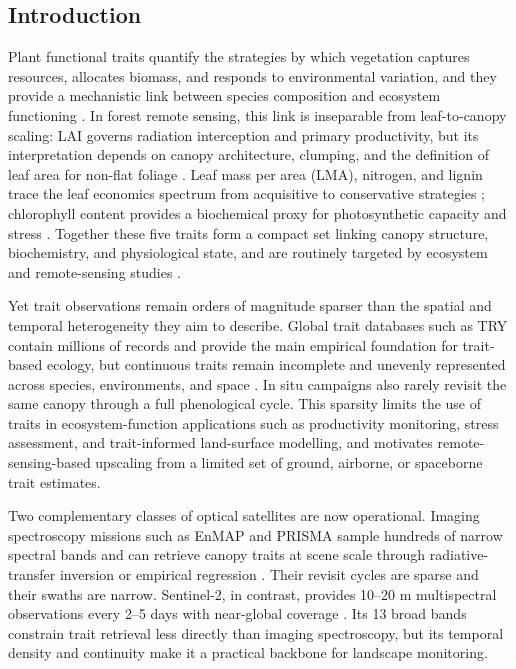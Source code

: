 \documentclass[final,times,onecolumn, authoryear]{elsarticle}
\begin{document}
\begin{linenumbers}

\section{Introduction}

Plant functional traits quantify the strategies by which vegetation captures resources, allocates biomass, and responds to environmental variation, and they provide a mechanistic link between species composition and ecosystem functioning \citep{wright2004leaf, diaz2016global}. In forest remote sensing, this link is inseparable from leaf-to-canopy scaling: LAI governs radiation interception and primary productivity, but its interpretation depends on canopy architecture, clumping, and the definition of leaf area for non-flat foliage \citep{chen1992lai, chen1995gap, chen1996optical}. Leaf mass per area (LMA), nitrogen, and lignin trace the leaf economics spectrum from acquisitive to conservative strategies \citep{wright2004leaf}; chlorophyll content provides a biochemical proxy for photosynthetic capacity and stress \citep{croft2017chlorophyll}. Together these five traits form a compact set linking canopy structure, biochemistry, and physiological state, and are routinely targeted by ecosystem and remote-sensing studies \citep{jetz2016monitoring}.

Yet trait observations remain orders of magnitude sparser than the spatial and temporal heterogeneity they aim to describe. Global trait databases such as TRY contain millions of records and provide the main empirical foundation for trait-based ecology, but continuous traits remain incomplete and unevenly represented across species, environments, and space \citep{kattge2020try}. In situ campaigns also rarely revisit the same canopy through a full phenological cycle. This sparsity limits the use of traits in ecosystem-function applications such as productivity monitoring, stress assessment, and trait-informed land-surface modelling, and motivates remote-sensing-based upscaling from a limited set of ground, airborne, or spaceborne trait estimates.

Two complementary classes of optical satellites are now operational. Imaging spectroscopy missions such as EnMAP and PRISMA sample hundreds of narrow spectral bands and can retrieve canopy traits at scene scale through radiative-transfer inversion or empirical regression \citep{guanter2015enmap, cogliati2021prisma}. Their revisit cycles are sparse and their swaths are narrow. Sentinel-2, in contrast, provides 10--20 m multispectral observations every 2--5 days with near-global coverage \citep{drusch2012sentinel}. Its 13 broad bands constrain trait retrieval less directly than imaging spectroscopy, but its temporal density and continuity make it a practical backbone for landscape monitoring.


\end{linenumbers}
\end{document}
